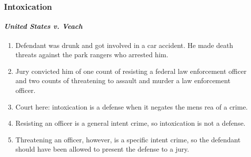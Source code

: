 \subsubsection{Intoxication}

\paragraph{\emph{United States v. Veach}}

\begin{enumerate}
    \item Defendant was drunk and got involved in a car accident. He made death threats against the park rangers who arrested him.
    \item Jury convicted him of one count of resisting a federal law enforcement officer and two counts of threatening to assault and murder a law enforcement officer.
    \item Court here: intoxication is a defense when it negates the mens rea of a crime.
    \item Resisting an officer is a general intent crime, so intoxication is not a defense.
    \item Threatening an officer, however, is a specific intent crime, so the defendant should have been allowed to present the defense to a jury.
\end{enumerate}
